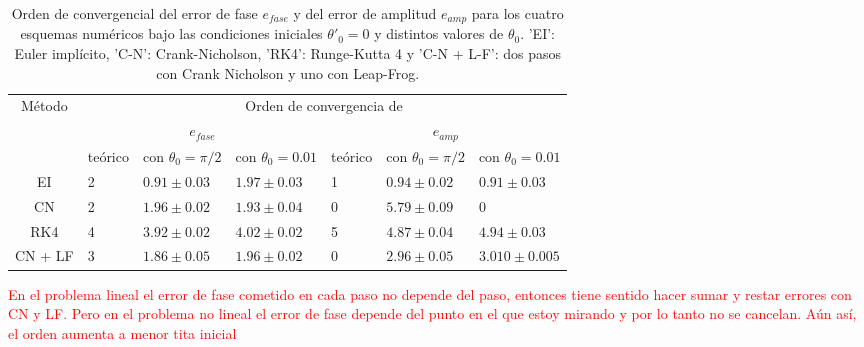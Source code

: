 \documentclass[aps,prb,twocolumn,superscriptaddress,floatfix,longbibliography]{revtex4-2}
\newcounter{para}
\begin{document}
\onecolumngrid

\begin{table}[]
  \begin{tabular}{|c|llllll|}
  \hline
  \multirow{3}{*}{Método} &
    \multicolumn{6}{c|}{Orden de convergencia de} \\ \cline{2-7} 
   &
    \multicolumn{3}{c|}{$e_{fase}$} &
    \multicolumn{3}{c|}{$e_{amp}$} \\ \cline{2-7} 
   &
    \multicolumn{1}{c|}{teórico} &
    \multicolumn{1}{c|}{con $\theta_0 = \pi/2$} &
    \multicolumn{1}{c|}{con $\theta_0 = 0.01$} &
    \multicolumn{1}{c|}{teórico} &
    \multicolumn{1}{c|}{con $\theta_0 = \pi/2$} &
    \multicolumn{1}{c|}{con $\theta_0 = 0.01$} \\ \hline
  EI &
    \multicolumn{1}{l|}{2} &
    \multicolumn{1}{l|}{$0.91 \pm 0.03$} &
    \multicolumn{1}{l|}{$1.97 \pm 0.03$} &
    \multicolumn{1}{l|}{1} &
    \multicolumn{1}{l|}{$0.94 \pm 0.02$} &
    $0.91 \pm 0.03$ \\ \hline
  CN &
    \multicolumn{1}{l|}{2} &
    \multicolumn{1}{l|}{$1.96 \pm 0.02$} &
    \multicolumn{1}{l|}{$1.93 \pm 0.04$} &
    \multicolumn{1}{l|}{0} &
    \multicolumn{1}{l|}{$5.79 \pm 0.09$} &
    0 \\ \hline
  RK4 &
    \multicolumn{1}{l|}{4} &
    \multicolumn{1}{l|}{$3.92 \pm 0.02$} &
    \multicolumn{1}{l|}{$4.02 \pm 0.02$} &
    \multicolumn{1}{l|}{5} &
    \multicolumn{1}{l|}{$4.87 \pm 0.04$} &
    $4.94 \pm 0.03$ \\ \hline
  CN + LF &
    \multicolumn{1}{l|}{3} &
    \multicolumn{1}{l|}{$1.86 \pm 0.05$} &
    \multicolumn{1}{l|}{$1.96 \pm 0.02$} &
    \multicolumn{1}{l|}{0} &
    \multicolumn{1}{l|}{$2.96 \pm 0.05$} &
    $3.010 \pm 0.005$ \\ \hline
  \end{tabular}
  \caption{\label{tabla:simple_errores} Orden de convergencial del error de fase $e_{fase}$ y del error de amplitud $e_{amp}$ para los cuatro esquemas numéricos bajo las condiciones iniciales $\theta'_0 = 0$ y distintos valores de $\theta_0$. 'EI': Euler implícito, 'C-N': Crank-Nicholson, 'RK4': Runge-Kutta 4 y 'C-N + L-F': dos pasos con Crank Nicholson y uno con Leap-Frog.}
  \end{table}

\textcolor{red}{En el problema lineal el error de fase cometido en cada paso no depende del paso, entonces tiene sentido hacer sumar y restar errores con CN y LF. Pero en el problema no lineal el error de fase depende del punto en el que estoy mirando y por lo tanto no se cancelan. Aún así, el orden aumenta a menor tita inicial}
\end{document}
